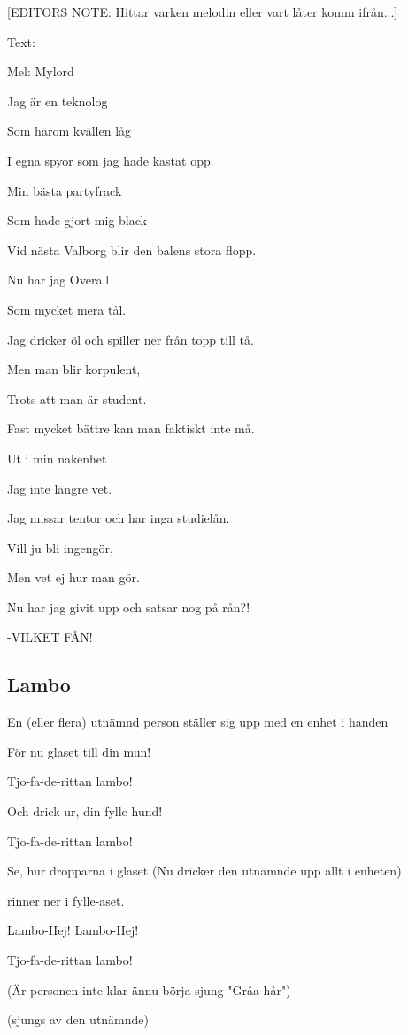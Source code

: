 [EDITORS NOTE: Hittar varken melodin eller vart låter komm ifrån...]

Text: 

Mel: Mylord\bigskip


Jag är en teknolog

Som härom kvällen låg

I egna spyor som jag hade kastat opp.

Min bästa partyfrack

Som hade gjort mig black

Vid nästa Valborg blir den balens stora 
flopp.\bigskip

Nu har jag Overall

Som mycket mera tål.

Jag dricker öl och spiller ner från topp 
till tå.

Men man blir korpulent,

Trots att man är student.

Fast mycket bättre kan man faktiskt inte 
må.\bigskip

Ut i min nakenhet

Jag inte längre vet.

Jag missar tentor och har inga studielån.

Vill ju bli ingengör,

Men vet ej hur man gör.

Nu har jag givit upp och satsar nog på rån?!

-VILKET FÅN! \bigskip

\subsection{\textbf{Lambo}}

En (eller flera) utnämnd person ställer sig upp med en enhet i handen

För nu glaset till din mun!

Tjo-fa-de-rittan lambo!

Och drick ur, din fylle-hund!

Tjo-fa-de-rittan lambo!

Se, hur dropparna i glaset (Nu dricker den utnämnde upp allt i enheten)

rinner ner i fylle-aset.

Lambo-Hej! Lambo-Hej!

Tjo-fa-de-rittan lambo!\bigskip

(Är personen inte klar ännu börja sjung "Gråa hår")\bigskip

(sjungs av den utnämnde)

